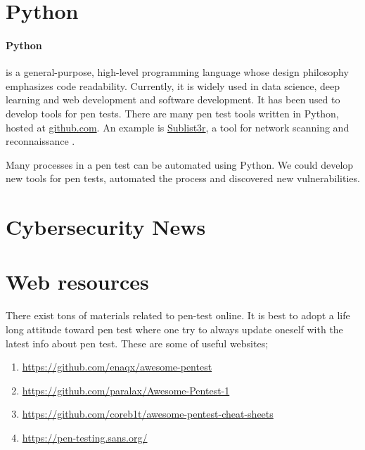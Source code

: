 \documentclass[7x9]{times}
\begin{document}
\section{Python}

\paragraph{Python}\cite{van2007python}\cite{lutz2013learning}
\cite{lutz2010programming} is a general-purpose, high-level 
programming language whose design philosophy emphasizes 
code readability. Currently, it is widely used in data 
science, deep learning and web development and software 
development. It has been used to develop tools for pen 
tests.  There are many pen test tools written in Python, 
hosted at \url{github.com}. An example is \url{Sublist3r}, 
a tool for network scanning and reconnaissance 
.    

Many processes in a pen test can be automated using Python.
We could develop new tools for pen tests, automated the
process and discovered new vulnerabilities.


%

\section{Cybersecurity News}

\section{Web resources}

There exist tons of materials related to pen-test online. It
is best to adopt a life long attitude toward pen test where
one try to always update oneself with the latest info about
pen test. These are some of useful websites;
\begin{enumerate}
\item \url{https://github.com/enaqx/awesome-pentest}
\item \url{https://github.com/paralax/Awesome-Pentest-1}
\item \url{https://github.com/coreb1t/awesome-pentest-cheat-sheets}
\item \url{https://pen-testing.sans.org/}
\end{enumerate}
\end{document}
